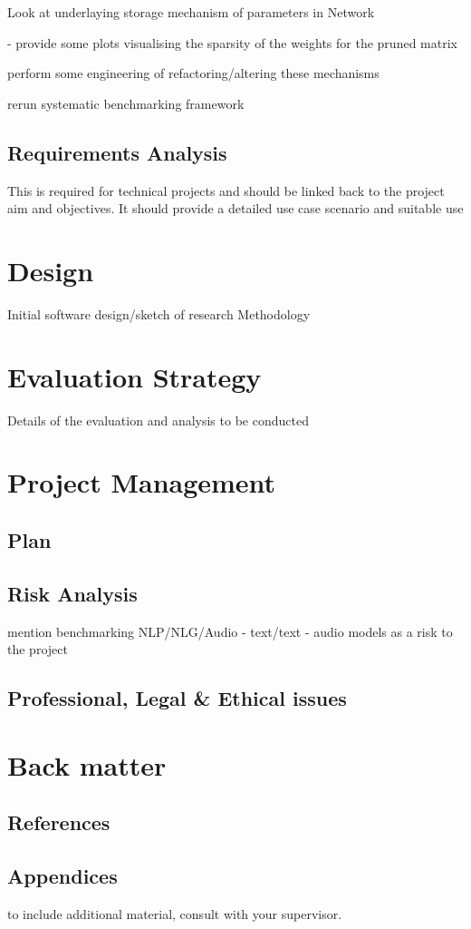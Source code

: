 \documentclass[11pt]{article}
\begin{document}
Look at underlaying storage mechanism of parameters in Network

 - provide some plots visualising the sparsity of the weights for the pruned matrix

perform some engineering of refactoring/altering these mechanisms

rerun systematic benchmarking framework





\subsection{Requirements Analysis}
This is required for technical projects and should be linked
back to the project aim and objectives. It should provide a detailed use case scenario
and suitable use

\pagebreak
\section{Design}
Initial software design/sketch of research Methodology

\pagebreak
\section{Evaluation Strategy}
Details of the evaluation and analysis to be conducted

\pagebreak
\section{Project Management}
\subsection{Plan}

\subsection{Risk Analysis}

mention benchmarking NLP/NLG/Audio - text/text - audio models as a risk to the project

\subsection{Professional, Legal \& Ethical issues}

\pagebreak
\appendix
\section{Back matter}
\subsection{References}
\printbibliography

\subsection{Appendices}
to include additional material, consult with your supervisor.\\

\printnoidxglossary[type=acronym]
\printacronyms
\end{document}
